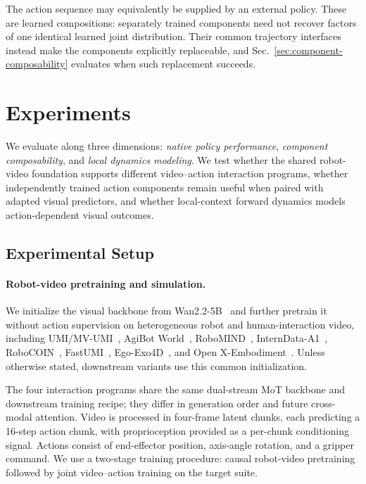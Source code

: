 The action sequence may equivalently be supplied by an external policy.
These are learned compositions: separately trained components need not
recover factors of one identical learned joint distribution. Their common
trajectory interfaces instead make the components explicitly replaceable,
and Sec.~\ref{sec:component-composability} evaluates when such replacement
succeeds.

\section{Experiments}
\label{sec:experiments}

We evaluate \ours along three dimensions: \emph{native policy performance},
\emph{component composability}, and \emph{local dynamics modeling}. We test
whether the shared robot-video foundation supports different video--action
interaction programs, whether independently trained action components remain
useful when paired with adapted visual predictors, and whether local-context forward
dynamics models action-dependent visual outcomes.

\subsection{Experimental Setup}
\label{sec:experimental-setup}

\paragraph{Robot-video pretraining and simulation.}
We initialize the visual backbone from Wan2.2-5B~\cite{wan2025wan} and further
pretrain it without action supervision on heterogeneous robot and
human-interaction video, including UMI/MV-UMI~\cite{chi2024universal,rayyan2026mv},
AgiBot World~\cite{bu2025agibot}, RoboMIND~\cite{wu2024robomind},
InternData-A1~\cite{tian2026interndata}, RoboCOIN~\cite{wu2025robocoin},
FastUMI~\cite{zhaxizhuoma2025fastumi}, Ego-Exo4D~\cite{grauman2024ego},
and Open X-Embodiment~\cite{o2024open}.
Unless otherwise stated, downstream \ours variants use this
common initialization.

The four interaction programs share the same dual-stream
MoT backbone and downstream training recipe; they
differ in generation order and future cross-modal attention. Video is
processed in four-frame latent chunks, each predicting a 16-step action
chunk, with proprioception provided as a per-chunk conditioning signal.
Actions consist of end-effector position, axis-angle rotation, and a
gripper command. We use a two-stage training procedure: causal
robot-video pretraining followed by joint video--action training on the
target suite.


